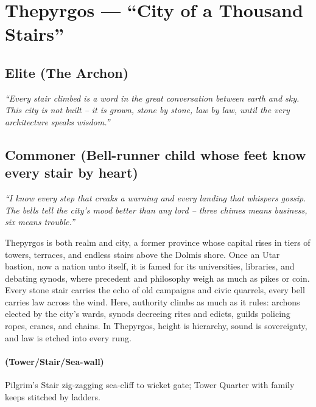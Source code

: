 \section{Thepyrgos --- ``City of a Thousand Stairs''}
\label{chap:thepyrgos}

\subsection*{Elite (The Archon)}
\textit{``Every stair climbed is a word in the great conversation between earth and sky. This city is not built – it is grown, stone by stone, law by law, until the very architecture speaks wisdom.''}

\subsection*{Commoner (Bell-runner child whose feet know every stair by heart)}
\textit{``I know every step that creaks a warning and every landing that whispers gossip. The bells tell the city's mood better than any lord – three chimes means business, six means trouble.''}

\begin{tcolorbox}[colback=black!3,colframe=black!40!white,title={Theme \& Atmosphere}]
Thepyrgos is both realm and city, a former province whose capital rises in tiers of towers, terraces, and endless stairs above the Dolmis shore. Once an Utar bastion, now a nation unto itself, it is famed for its universities, libraries, and debating synods, where precedent and philosophy weigh as much as pikes or coin. Every stone stair carries the echo of old campaigns and civic quarrels, every bell carries law across the wind. Here, authority climbs as much as it rules: archons elected by the city's wards, synods decreeing rites and edicts, guilds policing ropes, cranes, and chains. In Thepyrgos, height is hierarchy, sound is sovereignty, and law is etched into every rung.
\end{tcolorbox}

\paragraph*{(Tower/Stair/Sea-wall)} Pilgrim's Stair zig-zagging sea-cliff to wicket gate; Tower Quarter with family keeps stitched by ladders.


